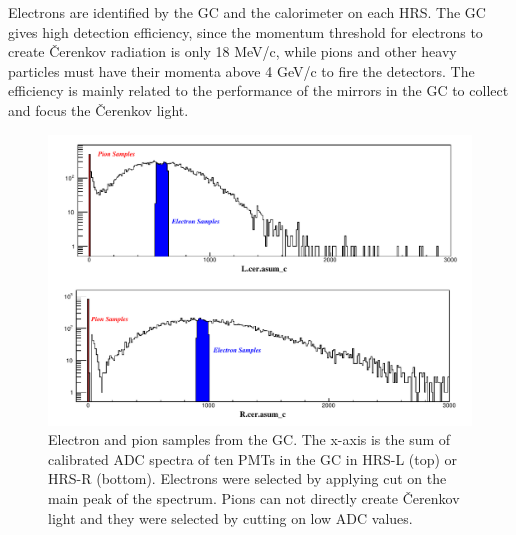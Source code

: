  Electrons are identified by the GC and the calorimeter on each HRS. The GC gives high detection efficiency, since the momentum threshold for electrons to create \v{C}erenkov radiation is only 18 MeV/c, while pions and other heavy particles must have their momenta above 4 GeV/c to fire the detectors. The efficiency is mainly related to the performance of the mirrors in the GC to collect and focus the \v{C}erenkov light. 
\begin{figure}[!ht]
  \begin{center}
    \includegraphics[type=pdf,ext=.pdf,read=.pdf,width=1.00\textwidth]{figures/pid/Calo_E_P_Sample_Cer}
    \caption[Electron and pion samples from the GC]{\footnotesize{Electron and pion samples from the GC. The x-axis is the sum of calibrated ADC spectra of ten PMTs in the GC in HRS-L (top) or HRS-R (bottom). Electrons were selected by applying cut on the main peak of the spectrum. Pions can not directly create \v{C}erenkov light and they were selected by cutting on low ADC values.}} 
    \label{gc_sample}
  \end{center}
\end{figure}

